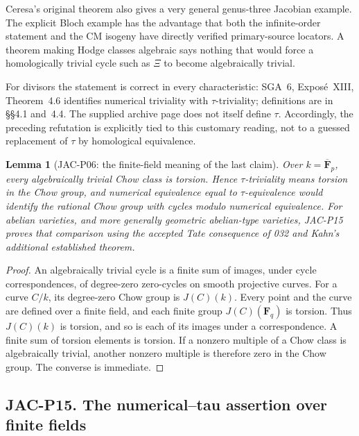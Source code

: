\documentclass[11pt,a4paper]{article}
\newtheorem{lemma}[theorem]{Lemma}
\begin{document}
Ceresa's original theorem also gives a very general genus-three
Jacobian example.  The explicit Bloch example has the advantage that
both the infinite-order statement and the CM isogeny have directly
verified primary-source locators.  A theorem making Hodge classes
algebraic says nothing that would force a homologically trivial
cycle such as $\Xi$ to become algebraically trivial.

For divisors the statement is correct in every characteristic:
SGA~6, Expos\'e~XIII, Theorem~4.6 identifies numerical triviality
with $\tau$-triviality; definitions are in \S\S4.1 and~4.4.
The supplied archive page does not itself define $\tau$.  Accordingly,
the preceding refutation is explicitly tied to this customary reading,
not to a guessed replacement of $\tau$ by homological equivalence.

\begin{lemma}[JAC-P06: the finite-field meaning of the last claim]
\label{jac:P06}
Over $k=\overline{\mathbf F}_p$, every algebraically trivial Chow class
is torsion.  Hence $\tau$-triviality means torsion in the Chow group,
and numerical equivalence equal to $\tau$-equivalence would identify
the rational Chow group with cycles modulo numerical equivalence.
For abelian varieties, and more generally geometric abelian-type
varieties, JAC-P15 proves that comparison using the accepted Tate
consequence of 032 and Kahn's additional established theorem.
\end{lemma}

\begin{proof}
An algebraically trivial cycle is a finite sum of images, under cycle
correspondences, of degree-zero zero-cycles on smooth projective curves.
For a curve $C/k$, its degree-zero Chow group is $J(C)(k)$.  Every
point and the curve are defined over a finite field, and each finite
group $J(C)(\mathbf F_q)$ is torsion.  Thus $J(C)(k)$ is torsion,
and so is each of its images under a correspondence.  A finite sum of
torsion elements is torsion.  If a nonzero multiple of a Chow class
is algebraically trivial, another nonzero multiple is therefore zero
in the Chow group.  The converse is immediate.
\end{proof}



\subsection*{JAC-P15. The numerical--tau assertion over finite fields}
\end{document}
